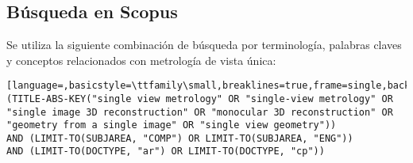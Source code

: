 \chapter*{}
\section*{Búsqueda en Scopus}
Se utiliza la siguiente combinación de búsqueda por terminología, palabras claves y conceptos relacionados con metrología de vista única:
\begin{lstlisting}[language=,basicstyle=\ttfamily\small,breaklines=true,frame=single,backgroundcolor=\color{gray!10}]
(TITLE-ABS-KEY("single view metrology" OR "single-view metrology" OR "single image 3D reconstruction" OR "monocular 3D reconstruction" OR "geometry from a single image" OR "single view geometry"))
AND (LIMIT-TO(SUBJAREA, "COMP") OR LIMIT-TO(SUBJAREA, "ENG"))
AND (LIMIT-TO(DOCTYPE, "ar") OR LIMIT-TO(DOCTYPE, "cp"))
\end{lstlisting}
